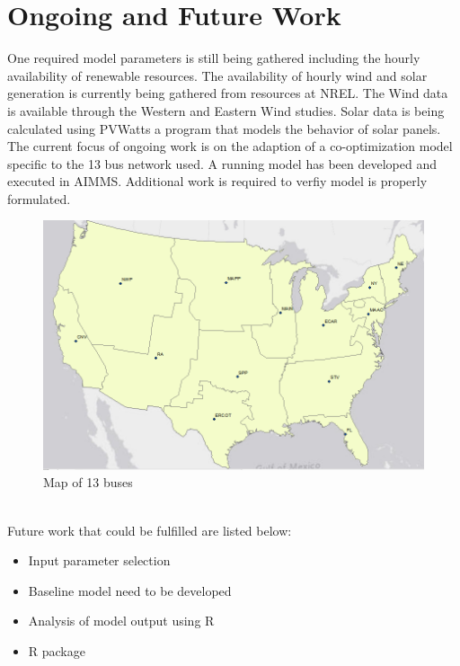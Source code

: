 \documentclass[oneside,12pt]{report}
\begin{document}
\chapter{Ongoing and Future Work} 
One required model parameters is still being gathered including the hourly availability of renewable resources. The availability of hourly wind and solar generation is currently being gathered from resources at NREL. The Wind data is available through the Western and Eastern Wind studies. Solar data is being calculated using PVWatts a program that models the behavior of solar panels.
\\The current focus of ongoing work is on the adaption of a co-optimization model specific to the 13 bus network used. A running model has been developed and executed in AIMMS. Additional work is required to verfiy model is properly formulated.
\begin{figure}[h] 
  \includegraphics[width=6in]{map.png}
  \caption[Map of 13 buses]
   {Map of 13 buses}
\end{figure}
\\Future work that could be fulfilled are listed below:
\begin{itemize}
	\item Input parameter selection
	\item Baseline model need to be developed
	\item Analysis of model output using R
	\item R package
\end{itemize}
\end{document}
